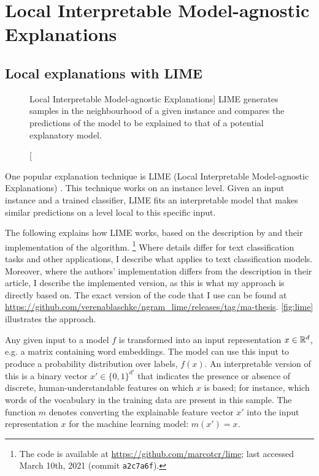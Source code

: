 \section{Local Interpretable Model-agnostic Explanations}
\label{sec:lime}

\subsection{Local explanations with LIME}
\label{sec:ml-lime}

\begin{figure}
    \centering
    
    \caption
    [Local Interpretable Model-agnostic Explanations]
    {LIME generates samples in the neighbourhood of a given instance and compares the predictions of the model to be explained to that of a potential explanatory model.}
    \label{fig:lime}
\end{figure}

One popular explanation technique is LIME (Local Interpretable Model-agnostic Explanations) \citep{ribeiro2016lime}.
This technique works on an instance level.
Given an input instance and a trained classifier, LIME fits an interpretable model that makes similar predictions on a level local to this specific input.

The following explains how LIME works, based on the description by \citeauthor{ribeiro2016lime} and their implementation of the algorithm.%
\footnote{The code is available at \url{https://github.com/marcotcr/lime}; last accessed March 10th, 2021 (commit \texttt{a2c7a6f}).}
Where details differ for text classification tasks and other applications, I describe what applies to text classification models.
Moreover, where the authors' implementation differs from the description in their article, I describe the implemented version, as this is what my approach is directly based on.
The exact version of the code that I use can be found at \url{https://github.com/verenablaschke/ngram_lime/releases/tag/ma-thesis}.
\autoref{fig:lime} illustrates the approach.

Any given input to a model $f$ is transformed into an input representation $x \in \mathbb{R}^d$, e.g. a matrix containing word embeddings.
The model can use this input to produce a probability distribution over labels, $f(x)$.
An interpretable version of this is a binary vector $x' \in \{0,1\}^{d'}$ that indicates the presence or absence of discrete, human-understandable features on which $x$ is based; for instance, which words of the vocabulary in the training data are present in this sample.
The function $m$ denotes converting the explainable feature vector $x'$ into the input representation $x$ for the machine learning model: $m(x') = x$.

